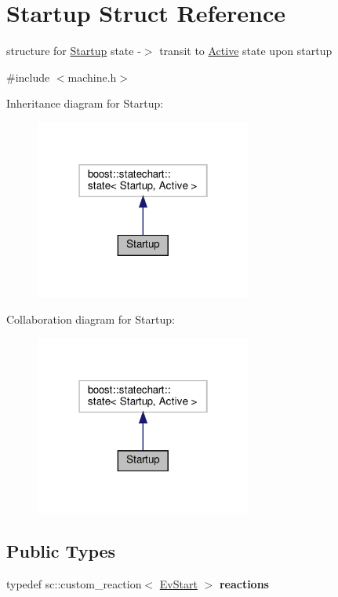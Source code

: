 \hypertarget{structStartup}{}\section{Startup Struct Reference}
\label{structStartup}


structure for \hyperlink{structStartup}{Startup} state -\/$>$ transit to \hyperlink{structActive}{Active} state upon startup  




{\ttfamily \#include $<$machine.\+h$>$}



Inheritance diagram for Startup\+:
\nopagebreak
\begin{figure}[H]
\begin{center}
\leavevmode
\includegraphics[width=202pt]{structStartup__inherit__graph}
\end{center}
\end{figure}


Collaboration diagram for Startup\+:
\nopagebreak
\begin{figure}[H]
\begin{center}
\leavevmode
\includegraphics[width=202pt]{structStartup__coll__graph}
\end{center}
\end{figure}
\subsection*{Public Types}
\begin{DoxyCompactItemize}
\item 
\mbox{\label{structStartup_adb819fed6342f9b211ffc4111ff70080}} 
typedef sc\+::custom\+\_\+reaction$<$ \hyperlink{structEvStart}{Ev\+Start} $>$ {\bfseries reactions}
\end{DoxyCompactItemize}
